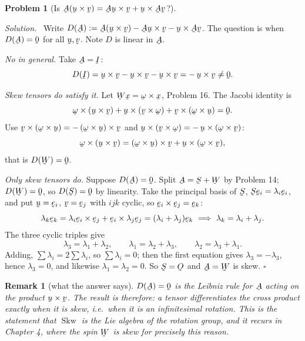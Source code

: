 \documentclass[17pt,a4paper]{extreport}
\DeclareRobustCommand{\vek}[1]{\underaccent{\tilde}{#1}}
\newcommand{\Skw}{\operatorname{Skw}}
\newcommand{\I}{\vek{I}}
\newcommand{\Ob}{\vek{O}}
\newcommand{\bu}{\vek{u}}
\newcommand{\bv}{\vek{v}}
\newcommand{\bx}{\vek{x}}
\newcommand{\be}{\vek{e}}
\newcommand{\bze}{\vek{0}}
\newcommand{\bA}{\vek{A}}
\newcommand{\bS}{\vek{S}}
\newcommand{\bW}{\vek{W}}
\newcommand{\bom}{\vek{\omega}}
\theoremstyle{scplain}
\theoremstyle{scdefn}
\newtheorem{remark}[theorem]{Remark}
\theoremstyle{scplain}
\newtheorem{problem}{Problem}
\newenvironment{solution}
 {\par\smallskip\noindent\textit{Solution.}\ }
 {\hfill$\square$\par\medskip}
\begin{document}
\begin{problem}[Is $\bA(\bu\times\bv)=\bA\bu\times\bv+\bu\times\bA\bv$?]
\end{problem}
\begin{solution}
Write $D(\bA):=\bA(\bu\times\bv)-\bA\bu\times\bv-\bu\times\bA\bv$. The
question is when $D(\bA)=\bze$ for all $\bu,\bv$. Note $D$ is linear in
$\bA$.

\emph{No in general.} Take $\bA=\I$:
\[
   D(\I)=\bu\times\bv-\bu\times\bv-\bu\times\bv=-\,\bu\times\bv\neq\bze .
\]

\emph{Skew tensors do satisfy it.} Let $\bW\bx=\bom\times\bx$, Problem 16.
The Jacobi identity is
\[
   \bom\times(\bu\times\bv)+\bu\times(\bv\times\bom)
   +\bv\times(\bom\times\bu)=\bze .
\]
Use $\bv\times(\bom\times\bu)=-\,(\bom\times\bu)\times\bv$ and
$\bu\times(\bv\times\bom)=-\,\bu\times(\bom\times\bv)$:
\[
   \bom\times(\bu\times\bv)=(\bom\times\bu)\times\bv
   +\bu\times(\bom\times\bv),
\]
that is $D(\bW)=\bze$.

\emph{Only skew tensors do.} Suppose $D(\bA)=\bze$. Split
$\bA=\bS+\bW$ by Problem 14; $D(\bW)=\bze$, so $D(\bS)=\bze$ by
linearity. Take the principal basis of $\bS$, $\bS\be_{i}=\lambda_{i}
\be_{i}$, and put $\bu=\be_{i}$, $\bv=\be_{j}$ with $ijk$ cyclic, so
$\be_{i}\times\be_{j}=\be_{k}$:
\[
   \lambda_{k}\be_{k}
   =\lambda_{i}\be_{i}\times\be_{j}+\be_{i}\times\lambda_{j}\be_{j}
   =(\lambda_{i}+\lambda_{j})\be_{k}
   \ \Longrightarrow\
   \lambda_{k}=\lambda_{i}+\lambda_{j}.
\]
The three cyclic triples give
\[
   \lambda_{3}=\lambda_{1}+\lambda_{2},\qquad
   \lambda_{1}=\lambda_{2}+\lambda_{3},\qquad
   \lambda_{2}=\lambda_{3}+\lambda_{1}.
\]
Adding, $\sum\lambda_{i}=2\sum\lambda_{i}$, so $\sum\lambda_{i}=0$; then
the first equation gives $\lambda_{3}=-\lambda_{3}$, hence
$\lambda_{3}=0$, and likewise $\lambda_{1}=\lambda_{2}=0$. So $\bS=\Ob$
and $\bA=\bW$ is skew.
\end{solution}

\begin{remark}[what the answer says]\label{rem:P7derivation}
$D(\bA)=\bze$ is the Leibniz rule for $\bA$ acting on the product
$\bu\times\bv$. The result is therefore: \emph{a tensor differentiates the
cross product exactly when it is skew}, i.e.\ when it is an infinitesimal
rotation. This is the statement that $\Skw$ is the Lie algebra of the
rotation group, and it recurs in Chapter 4, where the spin $\bW$ is skew
for precisely this reason.
\end{remark}
\end{document}
